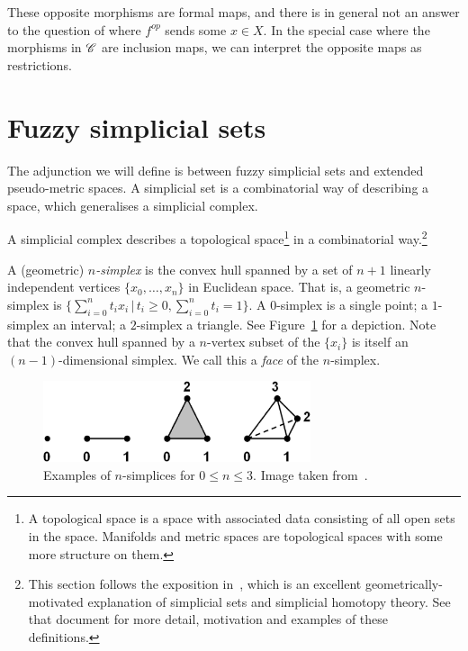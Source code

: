 \documentclass[a4paper,11pt,leqno]{article} \usepackage{amsmath}
\theoremstyle{definition}
\begin{document}
These opposite morphisms are formal maps, and there is in general not an answer
to the question of where $f^{op}$ sends some $x\in X$.
In the special case where the morphisms in $\mathscr{C}$ are inclusion maps, we can
interpret the opposite maps as restrictions.

\section{Fuzzy simplicial sets}
\label{section_fss}

The adjunction we will define is between fuzzy simplicial sets and extended
pseudo-metric spaces.
A simplicial set is a combinatorial way of describing
a space, which generalises a simplicial complex.

A simplicial complex describes a topological space\footnote{ A topological space
is a space with associated data consisting of all open sets in the space.
Manifolds and metric spaces are topological spaces with some more structure on
them.} in a combinatorial way.\footnote{ This section follows the exposition
in~\cite{Friedman08}, which is an excellent geometrically-motivated explanation
of simplicial sets and simplicial homotopy theory.
See that document for more
detail, motivation and examples of these definitions.}

A (geometric) \emph{$n$-simplex} is the convex hull spanned by a set of $n+1$
linearly independent vertices $\{x_0,\dots, x_n\}$ in Euclidean space.
That is,
a geometric $n$-simplex is $\{\sum_{i=0}^n t_ix_i\,|\, t_i\geq 0, \sum_{i=0}^n
t_i = 1\}$.
A $0$-simplex is a single point; a $1$-simplex an interval;
a $2$-simplex a triangle.
See Figure~\ref{fig_simplices} for a depiction.
Note
that the convex hull spanned by a $n$-vertex subset of the $\{x_i\}$ is itself
an $(n-1)$-dimensional simplex.
We call this a \emph{face} of the $n$-simplex.

\begin{figure} \centering
  \includegraphics[width=0.7\textwidth]{figures/simp2.jpg} \caption{Examples of
  $n$-simplices for $0\leq n\leq 3$.
  Image taken from~\cite{Friedman08}.}
\label{fig_simplices} \end{figure}
\end{document}
